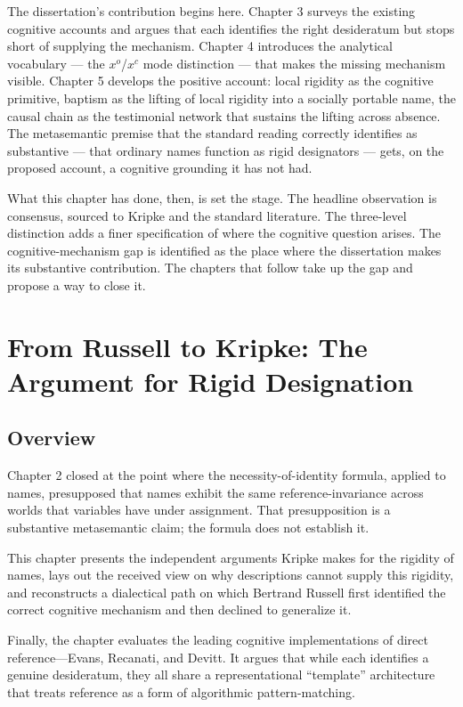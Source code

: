\documentclass[12pt,a4paper]{article}
\begin{document}
The dissertation's contribution begins here. Chapter 3 surveys the existing cognitive accounts and argues that each identifies the right desideratum but stops short of supplying the mechanism. Chapter 4 introduces the analytical vocabulary --- the \(x^o\)/\(x^c\) mode distinction --- that makes the missing mechanism visible. Chapter 5 develops the positive account: local rigidity as the cognitive primitive, baptism as the lifting of local rigidity into a socially portable name, the causal chain as the testimonial network that sustains the lifting across absence. The metasemantic premise that the standard reading correctly identifies as substantive --- that ordinary names function as rigid designators --- gets, on the proposed account, a cognitive grounding it has not had.

What this chapter has done, then, is set the stage. The headline observation is consensus, sourced to Kripke and the standard literature. The three-level distinction adds a finer specification of where the cognitive question arises. The cognitive-mechanism gap is identified as the place where the dissertation makes its substantive contribution. The chapters that follow take up the gap and propose a way to close it.

\section{From Russell to Kripke: The Argument for Rigid Designation}\label{from-russell-to-kripke-the-argument-for-rigid-designation}

\subsection{Overview}\label{overview}

Chapter 2 closed at the point where the necessity-of-identity formula, applied to names, presupposed that names exhibit the same reference-invariance across worlds that variables have under assignment. That presupposition is a substantive metasemantic claim; the formula does not establish it.

This chapter presents the independent arguments Kripke makes for the rigidity of names, lays out the received view on why descriptions cannot supply this rigidity, and reconstructs a dialectical path on which Bertrand Russell first identified the correct cognitive mechanism and then declined to generalize it.

Finally, the chapter evaluates the leading cognitive implementations of direct reference---Evans, Recanati, and Devitt. It argues that while each identifies a genuine desideratum, they all share a representational ``template'' architecture that treats reference as a form of algorithmic pattern-matching.
\end{document}
